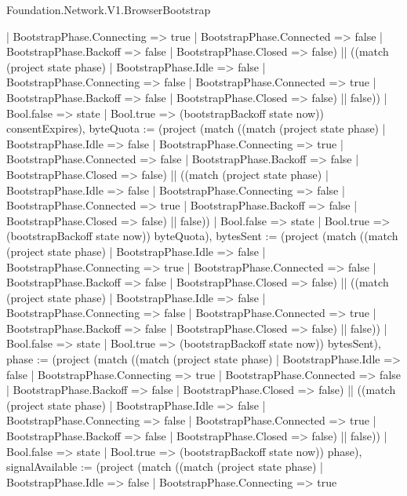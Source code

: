 \begin{lexlean}{Foundation.Network.V1.BrowserBootstrap}
\begin{semanticmodule}
{{          | BootstrapPhase.Connecting => true
          | BootstrapPhase.Connected => false
          | BootstrapPhase.Backoff => false
          | BootstrapPhase.Closed => false) || ((match (project state phase)
          | BootstrapPhase.Idle => false
          | BootstrapPhase.Connecting => false
          | BootstrapPhase.Connected => true
          | BootstrapPhase.Backoff => false
          | BootstrapPhase.Closed => false) || false))
        | Bool.false => state
        | Bool.true => (bootstrapBackoff state now)) consentExpires), byteQuota := (project (match ((match (project state phase)
          | BootstrapPhase.Idle => false
          | BootstrapPhase.Connecting => true
          | BootstrapPhase.Connected => false
          | BootstrapPhase.Backoff => false
          | BootstrapPhase.Closed => false) || ((match (project state phase)
          | BootstrapPhase.Idle => false
          | BootstrapPhase.Connecting => false
          | BootstrapPhase.Connected => true
          | BootstrapPhase.Backoff => false
          | BootstrapPhase.Closed => false) || false))
        | Bool.false => state
        | Bool.true => (bootstrapBackoff state now)) byteQuota), bytesSent := (project (match ((match (project state phase)
          | BootstrapPhase.Idle => false
          | BootstrapPhase.Connecting => true
          | BootstrapPhase.Connected => false
          | BootstrapPhase.Backoff => false
          | BootstrapPhase.Closed => false) || ((match (project state phase)
          | BootstrapPhase.Idle => false
          | BootstrapPhase.Connecting => false
          | BootstrapPhase.Connected => true
          | BootstrapPhase.Backoff => false
          | BootstrapPhase.Closed => false) || false))
        | Bool.false => state
        | Bool.true => (bootstrapBackoff state now)) bytesSent), phase := (project (match ((match (project state phase)
          | BootstrapPhase.Idle => false
          | BootstrapPhase.Connecting => true
          | BootstrapPhase.Connected => false
          | BootstrapPhase.Backoff => false
          | BootstrapPhase.Closed => false) || ((match (project state phase)
          | BootstrapPhase.Idle => false
          | BootstrapPhase.Connecting => false
          | BootstrapPhase.Connected => true
          | BootstrapPhase.Backoff => false
          | BootstrapPhase.Closed => false) || false))
        | Bool.false => state
        | Bool.true => (bootstrapBackoff state now)) phase), signalAvailable := (project (match ((match (project state phase)
          | BootstrapPhase.Idle => false
          | BootstrapPhase.Connecting => true
}}
\end{semanticmodule}
\end{lexlean}
